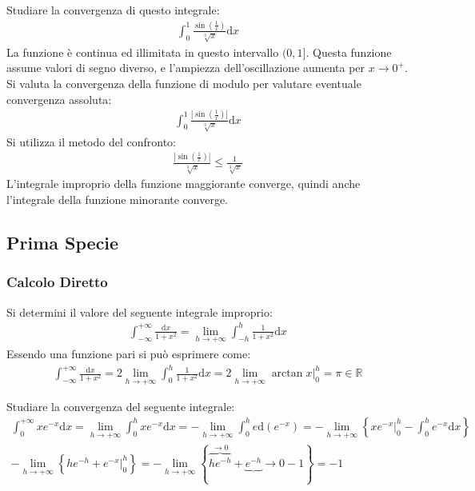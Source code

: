\documentclass{article}
\newcommand{\df}{\mathrm{d}}
\newcommand{\intab}[4]{\displaystyle\int_{#1}^{#2}{#3}\df{#4}}
\newcommand{\intpinf}[2]{\intab{0}{+\infty}{#1}{#2}}
\numberwithin{equation}{subsection}
\begin{document}
Studiare la convergenza di questo integrale:
\begin{gather*}
    \displaystyle\int_0^1\frac{\sin\left(\frac{1}{x}\right)}{\sqrt[3]{x}}\mathrm{d}x
\end{gather*}
La funzione è continua ed illimitata in questo intervallo $(0,1]$. Questa funzione assume valori di segno diverso, e l'ampiezza dell'oscillazione aumenta per $x\to0^+$. Si valuta la convergenza della funzione di modulo per valutare eventuale convergenza assoluta:
\begin{gather*}
    \displaystyle\int_0^1\frac{\left|\sin\left(\frac{1}{x}\right)\right|}{\sqrt[3]{x}}\mathrm{d}x
\end{gather*}
Si utilizza il metodo del confronto:
\begin{gather*}
    \displaystyle\frac{\left|\sin\left(\frac{1}{x}\right)\right|}{\sqrt[3]{x}}\leq\frac{1}{\sqrt[3]{x}}
\end{gather*}
L'integrale improprio della funzione maggiorante converge, quindi anche l'integrale della funzione minorante converge. 

\subsection{Prima Specie}

\subsubsection{Calcolo Diretto}

Si determini il valore del seguente integrale improprio:
\begin{gather*}
    \displaystyle\int_{-\infty}^{+\infty}\frac{\df x}{1+x^2}
    =\lim_{h\to+\infty}\int_{-h}^h\frac{1}{1+x^2}\df x
\end{gather*}
Essendo una funzione pari si può esprimere come:
\begin{gather*}
    \displaystyle\int_{-\infty}^{+\infty}\frac{\df x}{1+x^2}=
    2\lim_{h\to+\infty}\int_0^h\frac{1}{1+x^2}\df x=
    2\lim_{h\to+\infty}\arctan x\bigg|_0^h=\pi\in\mathbb{R}
\end{gather*}


Studiare la convergenza del seguente integrale:
\begin{gather*}
    \intpinf{xe^{-x}}{x}=\lim_{h\to+\infty}\int_0^hxe^{-x}\df x=-\lim_{h\to+\infty}\int_0^he\df(e^{-x})=
    -\lim_{h\to+\infty}\left\{xe^{-x}\bigg|_0^h-\int_0^he^{-x}\df x\right\}\\
    -\lim_{h\to+\infty}\left\{he^{-h}+e^{-x}\bigg|_0^h\right\}=
    -\lim_{h\to+\infty}\left\{\overbrace{he^{-h}}^{\to0}+\underbrace{e^{-h}}{\to0}-1\right\}=-1
\end{gather*}
\end{document}
